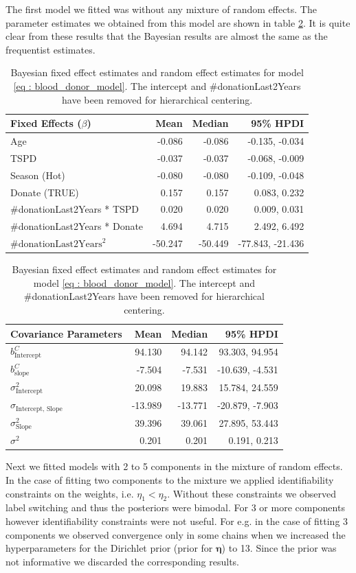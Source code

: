 The first model we fitted was without any mixture of random effects. The parameter estimates we obtained from this model are shown in table \ref{table : bayesian fixed effects}. It is quite clear from these results that the Bayesian results are almost the same as the frequentist estimates.

\begin{table}[!htb]
\centering
\captionsetup{justification=centering}
\caption{Bayesian fixed effect estimates and random effect estimates for model \ref{eq : blood_donor_model}. The intercept and \#donationLast2Years have been removed for hierarchical centering.}
\label{table : bayesian fixed effects}
\begin{tabular}{@{}lrrr@{}}
\toprule
Fixed Effects ($\beta$) & Mean & Median & 95\% HPDI \\ \midrule
Age & -0.086 & -0.086 & -0.135, -0.034\\
TSPD & -0.037 & -0.037 & -0.068, -0.009 \\
Season (Hot) & -0.080 & -0.080 & -0.109, -0.048\\
Donate (TRUE) & 0.157 & 0.157 & 0.083, 0.232 \\
\#donationLast2Years * TSPD & 0.020 & 0.020 & 0.009, 0.031  \\
\#donationLast2Years * Donate & 4.694 & 4.715 & 2.492, 6.492 \\
$\text{\#donationLast2Years}^2$ & -50.247 & -50.449 & -77.843, -21.436 \\ \bottomrule
\end{tabular}

\begin{tabular}{@{}lrrr@{}}
\toprule
Covariance Parameters & Mean & Median & 95\% HPDI \\ \midrule
$b_{\text{Intercept}}^C$& 94.130 & 94.142 & 93.303, 94.954\\
$b_{\text{slope}}^C$ & -7.504 & -7.531 & -10.639, -4.531\\
$\sigma^2_\text{Intercept}$ & 20.098 & 19.883 & 15.784, 24.559\\
$\sigma_\text{Intercept, Slope}$ & -13.989 & -13.771 & -20.879, -7.903\\
$\sigma^2_\text{Slope}$ & 39.396 & 39.061 & 27.895, 53.443\\
$\sigma^2$ & 0.201 & 0.201 & 0.191, 0.213\\ \bottomrule
\end{tabular}
\end{table}

Next we fitted models with 2 to 5 components in the mixture of random effects. In the case of fitting two components to the mixture we applied identifiability constraints on the weights, i.e. $\eta_1 < \eta_2$. Without these constraints we observed label switching and thus the posteriors were bimodal. For 3 or more components however identifiability constraints were not useful. For e.g. in the case of fitting 3 components we observed convergence only in some chains when we increased the hyperparameters for the Dirichlet prior (prior for $\boldsymbol{\eta}$) to 13. Since the prior was not informative we discarded the corresponding results.\\

